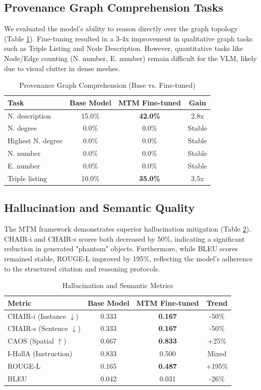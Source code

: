 \documentclass[11pt]{article}
\begin{document}
\subsection{Provenance Graph Comprehension Tasks}
We evaluated the model's ability to reason directly over the graph topology (Table \ref{tab:graph_comp}). Fine-tuning resulted in a 3-4x improvement in qualitative graph tasks such as Triple Listing and Node Description. However, quantitative tasks like Node/Edge counting (N. number, E. number) remain difficult for the VLM, likely due to visual clutter in dense meshes.

\begin{table}[h]
\centering
\caption{Provenance Graph Comprehension (Base vs. Fine-tuned)}
\label{tab:graph_comp}
\begin{tabular}{lccc}
\toprule
Task & Base Model & MTM Fine-tuned & Gain \\
\midrule
N. description & 15.0\% & \textbf{42.0\%} & 2.8x \\
N. degree & 0.0\% & 0.0\% & Stable \\
Highest N. degree & 0.0\% & 0.0\% & Stable \\
N. number & 0.0\% & 0.0\% & Stable \\
E. number & 0.0\% & 0.0\% & Stable \\
Triple listing & 10.0\% & \textbf{35.0\%} & 3.5x \\
\bottomrule
\end{tabular}
\end{table}

\subsection{Hallucination and Semantic Quality}
The MTM framework demonstrates superior hallucination mitigation (Table \ref{tab:hallucination}). CHAIR-i and CHAIR-s scores both decreased by 50\%, indicating a significant reduction in generated "phantom" objects. Furthermore, while BLEU scores remained stable, ROUGE-L improved by 195\%, reflecting the model's adherence to the structured citation and reasoning protocols.

\begin{table}[h]
\centering
\caption{Hallucination and Semantic Metrics}
\label{tab:hallucination}
\begin{tabular}{lccc}
\toprule
Metric & Base Model & MTM Fine-tuned & Trend \\
\midrule
CHAIR-i (Instance $\downarrow$) & 0.333 & \textbf{0.167} & -50\% \\
CHAIR-s (Sentence $\downarrow$) & 0.333 & \textbf{0.167} & -50\% \\
CAOS (Spatial $\uparrow$) & 0.667 & \textbf{0.833} & +25\% \\
I-HallA (Instruction) & 0.833 & 0.500 & Mixed \\
ROUGE-L & 0.165 & \textbf{0.487} & +195\% \\
BLEU & 0.042 & 0.031 & -26\% \\
\bottomrule
\end{tabular}
\end{table}
\end{document}
